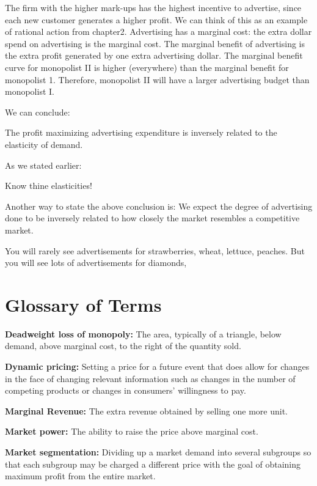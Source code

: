 \documentclass[
]{book}
\begin{document}
The firm with the higher mark-ups has the highest incentive to advertise, since each new customer generates a higher profit. We can think of this as an example of rational action from chapter2. Advertising has a marginal cost: the extra dollar spend on advertising is the marginal cost. The marginal benefit of advertising is the extra profit generated by one extra advertising dollar. The marginal benefit curve for monopolist II is higher (everywhere) than the marginal benefit for monopolist 1. Therefore, monopolist II will have a larger advertising budget than monopolist I.

We can conclude:

The profit maximizing advertising expenditure is inversely related to the elasticity of demand.

As we stated earlier:

\begin{center}
Know thine elasticities!

\end{center}

Another way to state the above conclusion is: We expect the degree of advertising done to be inversely related to how closely the market resembles a competitive market.

You will rarely see advertisements for strawberries, wheat, lettuce, peaches. But you will see lots of advertisements for diamonds,

\hypertarget{glossary-of-terms-7}{%
\section{Glossary of Terms}\label{glossary-of-terms-7}}

\textbf{Deadweight loss of monopoly:} The area, typically of a triangle, below demand, above marginal cost, to the right of the quantity sold.

\textbf{Dynamic pricing:} Setting a price for a future event that does allow for changes in the face of changing relevant information such as changes in the number of competing products or changes in consumers' willingness to pay.

\textbf{Marginal Revenue:} The extra revenue obtained by selling one more unit.

\textbf{Market power:} The ability to raise the price above marginal cost.

\textbf{Market segmentation:} Dividing up a market demand into several subgroups so that each subgroup may be charged a different price with the goal of obtaining maximum profit from the entire market.
\end{document}
